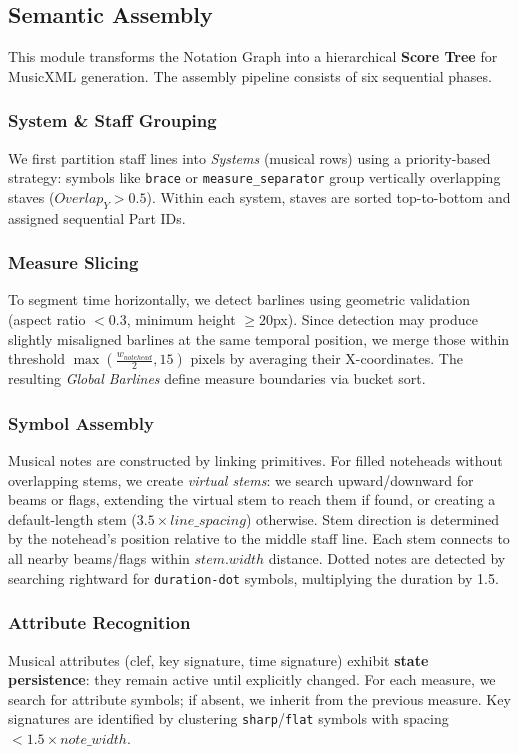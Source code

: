 \documentclass[twocolumn, a4paper, 10pt]{article}
\begin{document}
\subsection{Semantic Assembly}
This module transforms the Notation Graph into a hierarchical \textbf{Score Tree} for MusicXML generation. The assembly pipeline consists of six sequential phases.

\subsubsection{System \& Staff Grouping}
We first partition staff lines into \textit{Systems} (musical rows) using a priority-based strategy: symbols like \texttt{brace} or \texttt{measure\_separator} group vertically overlapping staves ($Overlap_Y > 0.5$). Within each system, staves are sorted top-to-bottom and assigned sequential Part IDs.

\subsubsection{Measure Slicing}
To segment time horizontally, we detect barlines using geometric validation (aspect ratio $< 0.3$, minimum height $\geq 20$px). Since detection may produce slightly misaligned barlines at the same temporal position, we merge those within threshold $\max(\frac{w_{notehead}}{2}, 15)$ pixels by averaging their X-coordinates. The resulting \textit{Global Barlines} define measure boundaries via bucket sort.

\subsubsection{Symbol Assembly}
Musical notes are constructed by linking primitives. For filled noteheads without overlapping stems, we create \textit{virtual stems}: we search upward/downward for beams or flags, extending the virtual stem to reach them if found, or creating a default-length stem ($3.5 \times line\_spacing$) otherwise. Stem direction is determined by the notehead's position relative to the middle staff line. Each stem connects to all nearby beams/flags within $stem.width$ distance. Dotted notes are detected by searching rightward for \texttt{duration-dot} symbols, multiplying the duration by 1.5.

\subsubsection{Attribute Recognition}
Musical attributes (clef, key signature, time signature) exhibit \textbf{state persistence}: they remain active until explicitly changed. For each measure, we search for attribute symbols; if absent, we inherit from the previous measure. Key signatures are identified by clustering \texttt{sharp}/\texttt{flat} symbols with spacing $< 1.5 \times note\_width$.
\end{document}
